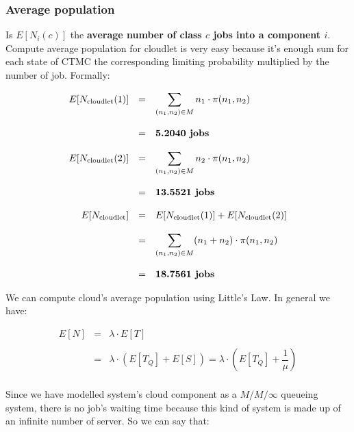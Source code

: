 \documentclass[10pt,a4paper]{article}
\begin{document}
\subsubsection{Average population}

Is $E[N_i(c)]$ the \textbf{average number of class $c$ jobs into a component $i$}. Compute average population for cloudlet is very easy because it's enough sum for each state of CTMC the corresponding limiting probability multiplied by the number of job. Formally:


\begin{equation}
\begin{array} {rcl} 
E[N_{\text{cloudlet}}(1)] & = & \displaystyle \sum_{ (n_1, n_2) \in M} n_1 \cdot \pi(n_1,n_2) \\
\\
& = & \textbf{5.2040 \text{jobs}} \\
\\
E[N_{\text{cloudlet}}(2)] & = & \displaystyle \sum_{ (n_1, n_2) \in M} n_2 \cdot \pi(n_1,n_2) \\
\\
& = & \textbf{13.5521 \text{jobs}} \\
\\
E[N_{\text{cloudlet}}] & = & E[N_{\text{cloudlet}}(1)] + E[N_{\text{cloudlet}}(2)] \\
\\
& = & \displaystyle \sum_{ (n_1, n_2) \in M} (n_1 + n_2) \cdot \pi(n_1,n_2) \\
\\
& = & \textbf{18.7561 \text{jobs}} 
\end{array}
\end{equation}

We can compute cloud's average population using Little’s Law. In general we have:

\begin{equation}
\begin{array} {rcl} 
E[N] & = & \lambda \cdot E[T] \\
\\
& = & \lambda \cdot (E[T_Q] + E[S]) = \lambda \cdot (E[T_Q] + \dfrac{1}{\mu}) \\
\end{array}
\end{equation}

Since we have modelled system's cloud component as a $M/M/\infty$ queueing system, there is no job's waiting time because this kind of system is made up of an infinite number of server. So we can say that:
\end{document}
